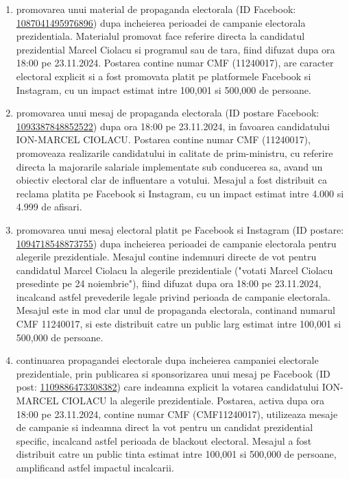 \documentclass[a4paper,12pt]{article}
\begin{document}
\begin{enumerate}[leftmargin=*, label=\arabic*.)]
    \item promovarea unui material de propaganda electorala (ID Facebook: \href{https://www.facebook.com/ads/library/?id=1087041495976896}{1087041495976896}) dupa incheierea perioadei de campanie electorala prezidentiala. Materialul promovat face referire directa la candidatul prezidential Marcel Ciolacu si programul sau de tara, fiind difuzat dupa ora 18:00 pe 23.11.2024. Postarea contine numar CMF (11240017), are caracter electoral explicit si a fost promovata platit pe platformele Facebook si Instagram, cu un impact estimat intre 100,001 si 500,000 de persoane.
    \item promovarea unui mesaj de propaganda electorala (ID postare Facebook: \href{https://www.facebook.com/ads/library/?id=1093387848852522}{1093387848852522}) dupa ora 18:00 pe 23.11.2024, in favoarea candidatului ION-MARCEL CIOLACU. Postarea contine numar CMF (11240017), promoveaza realizarile candidatului in calitate de prim-ministru, cu referire directa la majorarile salariale implementate sub conducerea sa, avand un obiectiv electoral clar de influentare a votului. Mesajul a fost distribuit ca reclama platita pe Facebook si Instagram, cu un impact estimat intre 4.000 si 4.999 de afisari.
    \item promovarea unui mesaj electoral platit pe Facebook si Instagram (ID postare: \href{https://www.facebook.com/ads/library/?id=1094718548873755}{1094718548873755}) dupa incheierea perioadei de campanie electorala pentru alegerile prezidentiale. Mesajul contine indemnuri directe de vot pentru candidatul Marcel Ciolacu la alegerile prezidentiale ("votati Marcel Ciolacu presedinte pe 24 noiembrie"), fiind difuzat dupa ora 18:00 pe 23.11.2024, incalcand astfel prevederile legale privind perioada de campanie electorala. Mesajul este in mod clar unul de propaganda electorala, continand numarul CMF 11240017, si este distribuit catre un public larg estimat intre 100,001 si 500,000 de persoane.
    \item continuarea propagandei electorale dupa incheierea campaniei electorale prezidentiale, prin publicarea si sponsorizarea unui mesaj pe Facebook (ID post: \href{https://www.facebook.com/ads/library/?id=1109886473308382}{1109886473308382}) care indeamna explicit la votarea candidatului ION-MARCEL CIOLACU la alegerile prezidentiale. Postarea, activa dupa ora 18:00 pe 23.11.2024, contine numar CMF (CMF11240017), utilizeaza mesaje de campanie si indeamna direct la vot pentru un candidat prezidential specific, incalcand astfel perioada de blackout electoral. Mesajul a fost distribuit catre un public tinta estimat intre 100,001 si 500,000 de persoane, amplificand astfel impactul incalcarii.

\end{enumerate}
\end{document}
